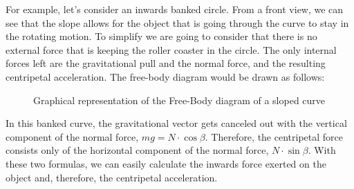 \documentclass[12pt,twoside,a4paper]{article}
\begin{document}
	For example, let's consider an inwards banked circle. From a front view, we can see that the slope allows for the object that is going through the curve to stay in the rotating motion. To simplify we are going to consider that there is no external force that is keeping the roller coaster in the circle. The only internal forces left are the gravitational pull and the normal force, and the resulting centripetal acceleration. The free-body diagram would be drawn as follows:
	
	\begin{figure}[H]
		\centering
		\caption{Graphical representation of the Free-Body diagram of a sloped curve}
		\label{graph:Free-body diagram}
	\end{figure}
	
	In this banked curve, the gravitational vector gets canceled out with the vertical component of the normal force, $mg = N \cdot \cos\beta$. Therefore, the centripetal force consists only of the horizontal component of the normal force, $N \cdot \sin\beta$. With these two formulas, we can easily calculate the inwards force exerted on the object and, therefore, the centripetal acceleration.
	
\end{document}

